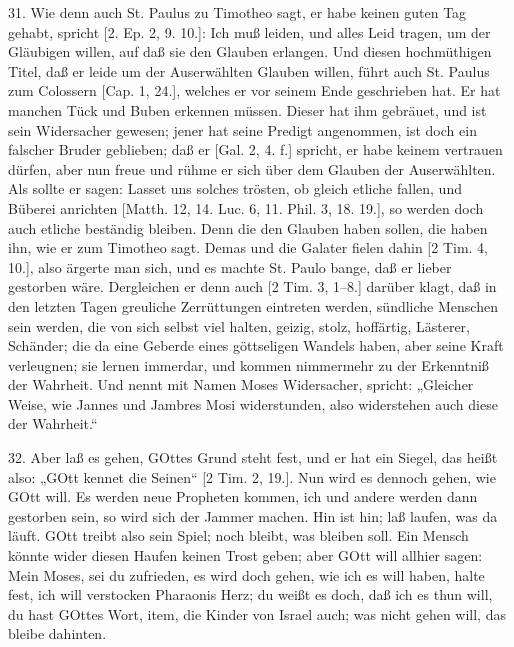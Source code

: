 31. Wie denn auch St. Paulus zu Timotheo sagt, er habe keinen guten Tag gehabt, spricht [2. Ep. 2, 9. 10.]: Ich muß leiden, und alles Leid tragen, um der Gläubigen willen, auf daß sie den Glauben erlangen. Und diesen hochmüthigen Titel, daß er leide um der Auserwählten Glauben willen, führt auch St. Paulus zum Colossern [Cap. 1, 24.], welches er vor seinem Ende geschrieben hat. Er hat manchen Tück und Buben erkennen müssen. Dieser hat ihm gebräuet, und ist sein Widersacher gewesen; jener hat seine Predigt angenommen, ist doch ein falscher Bruder geblieben; daß er [Gal. 2, 4. f.] spricht, er habe keinem vertrauen dürfen, aber nun freue und rühme er sich über dem Glauben der Auserwählten. Als sollte er sagen: Lasset uns solches trösten, ob gleich etliche fallen, und Büberei anrichten [Matth. 12, 14. Luc. 6, 11. Phil. 3, 18. 19.], so werden doch auch etliche beständig bleiben. Denn die den Glauben haben sollen, die haben ihn, wie er zum Timotheo sagt. Demas und die Galater fielen dahin [2 Tim. 4, 10.], also ärgerte man sich, und es machte St. Paulo bange, daß er lieber gestorben wäre. Dergleichen er denn auch [2 Tim. 3, 1–8.] darüber klagt, daß in den letzten Tagen greuliche Zerrüttungen eintreten werden, sündliche Menschen sein werden, die von sich selbst viel halten, geizig, stolz, hoffärtig, Lästerer, Schänder; die da eine Geberde eines göttseligen Wandels haben, aber seine Kraft verleugnen; sie lernen immerdar, und kommen nimmermehr zu der Erkenntniß der Wahrheit. Und nennt mit Namen Moses Widersacher, spricht: „Gleicher Weise, wie Jannes und Jambres Mosi widerstunden, also widerstehen auch diese der Wahrheit.“

32. Aber laß es gehen, GOttes Grund steht fest, und er hat ein Siegel, das heißt also: „GOtt kennet die Seinen“ [2 Tim. 2, 19.]. Nun wird es dennoch gehen, wie GOtt will. Es werden neue Propheten kommen, ich und andere werden dann gestorben sein, so wird sich der Jammer machen. Hin ist hin; laß laufen, was da läuft. GOtt treibt also sein Spiel; noch bleibt, was bleiben soll. Ein Mensch könnte wider diesen Haufen keinen Trost geben; aber GOtt will allhier sagen: Mein Moses, sei du zufrieden, es wird doch gehen, wie ich es will haben, halte fest, ich will verstocken Pharaonis Herz; du weißt es doch, daß ich es thun will, du hast GOttes Wort, item, die Kinder von Israel auch; was nicht gehen will, das bleibe dahinten.

